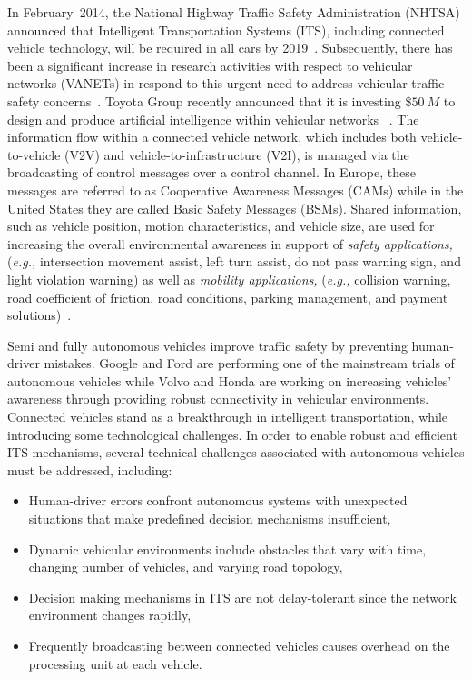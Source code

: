 \documentclass[journal, 11pt]{IEEEtran}
\begin{document}
In February~2014, the National Highway Traffic Safety Administration (NHTSA)
announced that Intelligent Transportation Systems (ITS), including connected
vehicle technology, will be required in all cars by 2019~\cite{factsheet}.
Subsequently, there has been a significant increase in research activities with
respect to vehicular networks (VANETs) in respond to this urgent need to
address vehicular traffic safety concerns~\cite{ntsb}. Toyota Group recently
announced that it is investing \$$50~M$ to design and produce artificial
intelligence within vehicular networks ~\cite{toyota50M}. The information flow
within a connected vehicle network, which includes both vehicle-to-vehicle (V2V)
and vehicle-to-infrastructure (V2I), is managed via the broadcasting of control
messages over a control channel. In Europe, these messages are referred to as
Cooperative Awareness Messages (CAMs) while in the United States they are called
Basic Safety Messages (BSMs). Shared information, such as vehicle position,
motion characteristics, and vehicle size, are used for increasing the overall
environmental awareness in support of \textit{safety applications,}
(\textit{e.g.,} intersection movement assist, left turn assist, do not pass
warning sign, and light violation warning) as well as \textit{mobility
applications,} (\textit{e.g.,} collision warning, road coefficient of friction,
road conditions, parking management, and payment
solutions)~\cite{hardingNHTSA14}.

Semi and fully autonomous vehicles improve traffic safety by preventing
human-driver mistakes. Google and Ford are performing one of the mainstream
trials of autonomous vehicles while Volvo and Honda are working on increasing
vehicles' awareness through providing robust connectivity in vehicular
environments. Connected vehicles stand as a breakthrough in intelligent
transportation, while introducing some technological challenges. In order to
enable robust and efficient ITS mechanisms, several technical challenges
associated with autonomous vehicles must be addressed, including:

\begin{itemize}
\item Human-driver errors confront autonomous systems with unexpected
situations that make predefined decision mechanisms insufficient,
\item Dynamic vehicular environments include obstacles that vary with time,
changing number of vehicles, and varying road topology,
\item Decision making mechanisms in ITS are not delay-tolerant since the network
environment changes rapidly,
\item Frequently broadcasting between connected vehicles causes overhead on the
processing unit at each vehicle.
\end{itemize}
\end{document}
